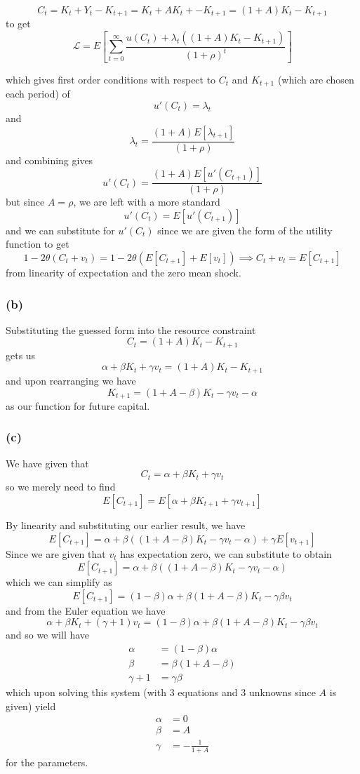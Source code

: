 \documentclass[11pt]{amsart}
\begin{document}
\[
C_t = K_t + Y_t - K_{t+1} =  K_t + A K_t + - K_{t+1}  = (1 + A) K_t - K_{t+1}
\]
to get
\[
\mathcal{L} = E \left[ \sum_{t=0}^{\infty} \frac{u(C_t) + \lambda_t ((1 + A) K_t - K_{t+1})}{(1+\rho)^t} \right]
\]

which gives first order conditions with respect to $C_t$ and $K_{t+1}$ (which are chosen each period) of 
\[
u'(C_t) = \lambda_t
\]
and
\[
\lambda_t = \frac{(1+A) E[\lambda_{t+1}]}{(1+\rho)}
\]
and combining gives
\[
u'(C_t) = \frac{(1+A) E[u'(C_{t+1})]}{(1+\rho)}
\]
but since $A=\rho$, we are left with a more standard
\[
u'(C_t) = E[u'(C_{t+1})]
\]
and we can substitute for $u'(C_t)$ since we are given the form of the utility function to get 
\[
1 - 2 \theta (C_t + v_t) = 1 - 2 \theta (E[C_{t+1}] + E[v_t]) \implies C_t + v_t = E[C_{t+1}] 
\]
from linearity of expectation and the zero mean shock.

\subsubsection*{(b)}

Substituting the guessed form into the resource constraint
\[
C_t = (1 + A) K_t - K_{t+1}
\]
gets us
\[
\alpha + \beta K_t + \gamma v_t = (1 + A) K_t - K_{t+1}
\]
and upon rearranging we have
\[
K_{t+1} = (1 + A - \beta) K_t - \gamma v_t - \alpha
\]
as our function for future capital.

\subsubsection*{(c)}

We have given that 
\[
C_t = \alpha + \beta K_t + \gamma v_t 
\]
so we merely need to find 
\[
E[C_{t+1}] = E[\alpha + \beta K_{t+1} + \gamma v_{t+1}]
\]

By linearity and substituting our earlier result, we have
\[
E[C_{t+1}] = \alpha + \beta ((1 + A - \beta) K_t - \gamma v_t - \alpha) + \gamma E[v_{t+1}]
\]
Since we are given that $v_t$ has expectation zero, we can substitute to obtain
\[
E[C_{t+1}] = \alpha + \beta ((1 + A - \beta) K_t - \gamma v_t - \alpha)
\]
which we can simplify as
\[
E[C_{t+1}] = (1 - \beta) \alpha + \beta (1 + A - \beta) K_t - \gamma \beta v_t
\]
and from the Euler equation we have
\[
\alpha + \beta K_t + (\gamma + 1) v_t  = (1 - \beta) \alpha + \beta (1 + A - \beta) K_t - \gamma \beta v_t
\]
and so we will have
\begin{align*}
\alpha &= (1 - \beta) \alpha \\
\beta &= \beta (1 + A - \beta) \\
\gamma + 1 &= \gamma \beta
\end{align*}
which upon solving this system (with 3 equations and 3 unknowns since $A$ is given) yield 
\begin{align*}
\alpha &= 0 \\
\beta &= A\\
\gamma &= -\frac{1}{1 + A}
\end{align*}
for the parameters.
\end{document}
